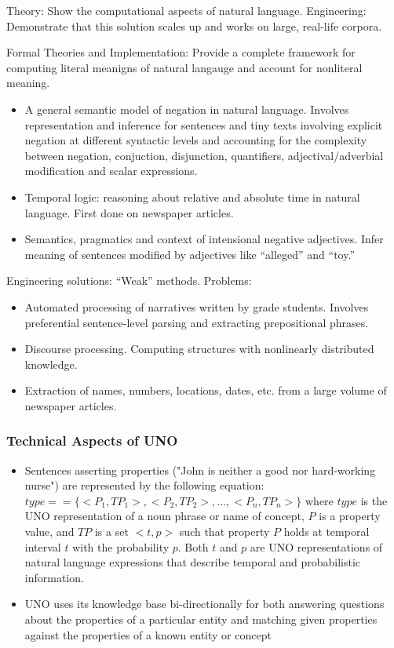 \documentclass[11pt]{article}
\begin{document}
Theory: Show the computational aspects of natural language. Engineering: Demonstrate that this solution scales up and works on large, real-life corpora.  

Formal Theories and Implementation: Provide a complete framework for computing literal meanigns of natural langauge and account for nonliteral meaning.

\begin{itemize}
\item A general semantic model of negation in natural language. Involves representation and inference for sentences and tiny texts involving explicit negation at different syntactic levels and accounting for the complexity between negation, conjuction, disjunction, quantifiers, adjectival/adverbial modification and scalar expressions.
\item Temporal logic: reasoning about relative and absolute time in natural language. First done on newspaper articles.
\item Semantics, pragmatics and context of intensional negative adjectives. Infer meaning of sentences modified by adjectives like ``alleged'' and ``toy.''
\end{itemize}

Engineering solutions: ``Weak'' methods.  Problems:

\begin{itemize}
\item Automated processing of narratives written by grade students. Involves preferential sentence-level parsing and extracting prepositional phrases.
\item Discourse processing. Computing structures with nonlinearly distributed knowledge. 
\item Extraction of names, numbers, locations, dates, etc. from a large volume of newspaper articles.
\end{itemize}

\subsubsection{Technical Aspects of UNO}

\begin{itemize}
\item Sentences asserting properties ("John is neither a good nor hard-working nurse") are represented by the following equation: \\ $type == \{<P_{1}, TP_{1}>, <P_{2}, TP_{2}>, \dots, <P_{n}, TP_{n}>\}$
where $type$ is the UNO representation of a noun phrase or name of concept, $P$ is a property value, and $TP$ is a set $<t, p>$ such that property $P$ holds at temporal interval $t$ with the probability $p$.   Both $t$ and $p$ are UNO representations of natural language expressions that describe temporal and probabilistic information.
\item UNO uses its knowledge base bi-directionally for both answering questions about the properties of a particular entity and matching given properties against the properties of a known entity or concept
\end{itemize}
\end{document}
